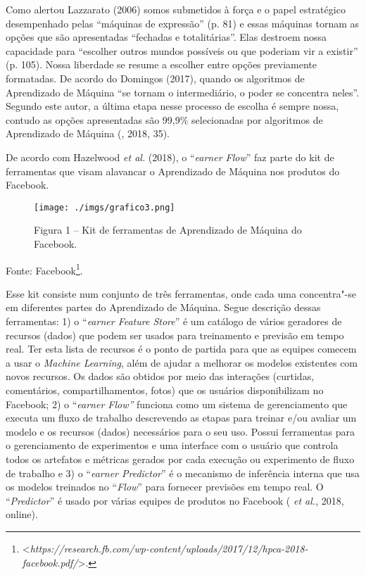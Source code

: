 Como alertou Lazzarato (2006) somos submetidos à força e o papel
estratégico desempenhado pelas ``máquinas de expressão'' (p. 81) e essas
máquinas tornam as opções que são apresentadas ``fechadas e
totalitárias''. Elas destroem nossa capacidade para ``escolher outros
mundos possíveis ou que poderiam vir a existir'' (p. 105). Nossa
liberdade se resume a escolher entre opções previamente formatadas. De
acordo do Domingos (2017), quando os algoritmos de Aprendizado de
Máquina ``se tornam o intermediário, o poder se concentra neles''.
Segundo este autor, a última etapa nesse processo de escolha é sempre
nossa, contudo as opções apresentadas são 99,9\% selecionadas por
algoritmos de Aprendizado de Máquina (, 2018, 35).

De acordo com Hazelwood \emph{et al.} (2018), o ``\emph{earner Flow}'' faz
parte do kit de ferramentas que visam alavancar o Aprendizado de Máquina
nos produtos do Facebook.

\begin{figure}[!ht]
\centering
  \texttt{[image: ./imgs/grafico3.png]}
\caption{Figura 1 -- Kit de ferramentas de Aprendizado de Máquina do Facebook.}
 \end{figure}

Fonte: Facebook\footnote{\mbox{\textless{}\emph{https://research.fb.com/wp-content/uploads/2017/12/hpca-2018-facebook.pdf/}\textgreater{}.}}.

Esse kit consiste num conjunto de três ferramentas, onde cada uma
concentra"-se em diferentes partes do Aprendizado de Máquina. Segue
descrição dessas ferramentas: 1) o ``\emph{earner Feature Store}'' é
um catálogo de vários geradores de recursos (dados) que podem ser usados
para treinamento e previsão em tempo real. Ter esta lista de recursos é
o ponto de partida para que as equipes comecem a usar o \emph{Machine
Learning}, além de ajudar a melhorar os modelos existentes com novos
recursos. Os dados são obtidos por meio das interações (curtidas,
comentários, compartilhamentos, fotos) que os usuários disponibilizam no
Facebook; 2) o ``\emph{earner Flow''} funciona como um sistema de
gerenciamento que executa um fluxo de trabalho descrevendo as etapas
para treinar e/ou avaliar um modelo e os recursos (dados) necessários
para o seu uso. Possui ferramentas para o gerenciamento de experimentos
e uma interface com o usuário que controla todos os artefatos e métricas
gerados por cada execução ou experimento de fluxo de trabalho e 3) o
``\emph{earner Predictor}'' é o mecanismo de inferência interna que
usa os modelos treinados no ``\emph{Flow}'' para fornecer previsões em
tempo real. O ``\emph{Predictor}'' é usado por várias equipes de
produtos no Facebook ( \emph{et al.}, 2018, online).

